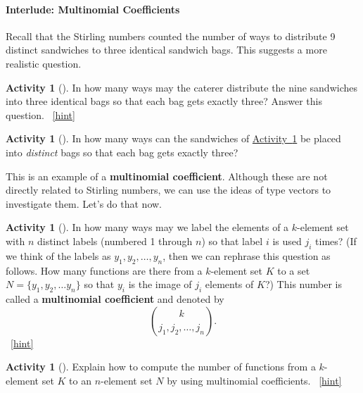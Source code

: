 \documentclass[10pt,]{book}
\newcommand{\terminology}[1]{\textbf{#1}}
\theoremstyle{plain}
\theoremstyle{definition}
\theoremstyle{definition}
\theoremstyle{definition}
\newtheorem{activity}[project]{Activity}
\numberwithin{equation}{chapter}
\begin{document}
\paragraph[{Interlude: Multinomial Coefficients}]{Interlude: Multinomial Coefficients}\hypertarget{pars-multinomial}{}
\hypertarget{p-1422}{}%
Recall that the Stirling numbers counted the number of ways to distribute 9 distinct sandwiches to three identical sandwich bags.  This suggests a more realistic question.%
\begin{activity}[]\label{caterer2}
\hypertarget{p-1423}{}%
In how many ways may the caterer distribute the nine sandwiches into three identical bags so that each bag gets exactly three? Answer this question.%
~\hfill{\tiny\hyperlink{a-279}{[hint]}\hypertarget{q-279}{}}\end{activity}
\begin{activity}[]\label{activity-273}
\hypertarget{p-1426}{}%
In how many ways can the sandwiches of \hyperref[caterer2]{Activity~\ref{caterer2}} be placed into \emph{distinct} bags so that each bag gets exactly three?%
\end{activity}
\hypertarget{p-1429}{}%
This is an example of a \terminology{multinomial coefficient}.  Although these are not directly related to Stirling numbers, we can use the ideas of type vectors to investigate them.  Let's do that now.%
\begin{activity}[]\label{activity-274}
\hypertarget{p-1430}{}%
In how many ways may we label the elements of a \(k\)-element set with \(n\) distinct labels (numbered 1 through \(n\)) so that label \(i\) is used \(j_i\) times? (If we think of the labels as \(y_1, y_2, \ldots, y_n\), then we can rephrase this question as follows.  How many functions are there from a \(k\)-element set \(K\) to a set \(N=\{y_1,y_2,\ldots y_n\}\) so that \(y_i\) is the image of \(j_i\) elements of \(K\)?) This number is called a \terminology{multinomial coefficient} and denoted by%
\begin{equation*}
\binom{k}{j_1,j_2,\ldots, j_n}.
\end{equation*}
%
~\hfill{\tiny\hyperlink{a-281}{[hint]}\hypertarget{q-281}{}}\end{activity}
\begin{activity}[]\label{activity-275}
\hypertarget{p-1434}{}%
Explain how to compute the number of functions from a \(k\)-element set \(K\) to an \(n\)-element set \(N\) by using multinomial coefficients.%
~\hfill{\tiny\hyperlink{a-282}{[hint]}\hypertarget{q-282}{}}\end{activity}
\end{document}
